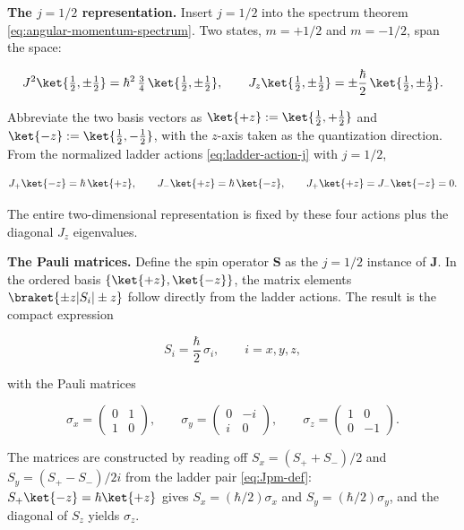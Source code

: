 \medskip\noindent\textbf{The $j=1/2$ representation.} Insert $j = 1/2$ into the spectrum theorem \eqref{eq:angular-momentum-spectrum}. Two states, $m = +1/2$ and $m = -1/2$, span the space:
\begin{linenomath}
  \begin{equation}
    J^2\ket{\tfrac12,\pm\tfrac12} = \hbar^2\,\tfrac34\,\ket{\tfrac12,\pm\tfrac12},
    \qquad
    J_z\ket{\tfrac12,\pm\tfrac12} = \pm\frac{\hbar}{2}\,\ket{\tfrac12,\pm\tfrac12}.
  \end{equation}
\end{linenomath}
Abbreviate the two basis vectors as $\ket{+z} := \ket{\tfrac12,+\tfrac12}$ and $\ket{-z} := \ket{\tfrac12,-\tfrac12}$, with the $z$-axis taken as the quantization direction. From the normalized ladder actions \eqref{eq:ladder-action-j} with $j = 1/2$,
\begin{linenomath}
  \begin{equation}
    J_+\ket{-z} = \hbar\,\ket{+z}, \qquad
    J_-\ket{+z} = \hbar\,\ket{-z}, \qquad
    J_+\ket{+z} = J_-\ket{-z} = 0.
  \end{equation}
\end{linenomath}
The entire two-dimensional representation is fixed by these four actions plus the diagonal $J_z$ eigenvalues.

\medskip\noindent\textbf{The Pauli matrices.} Define the spin operator $\bm S$ as the $j = 1/2$ instance of $\bm J$. In the ordered basis $\{\ket{+z},\ket{-z}\}$, the matrix elements $\braket{\pm z|S_i|\pm z}$ follow directly from the ladder actions. The result is the compact expression
\begin{linenomath}
  \begin{equation}
    S_i = \frac{\hbar}{2}\,\sigma_i, \qquad i = x,y,z,
    \label{eq:pauli-matrices}
  \end{equation}
\end{linenomath}
with the Pauli matrices
\begin{linenomath}
  \begin{equation}
    \sigma_x = \begin{pmatrix} 0 & 1 \\ 1 & 0 \end{pmatrix}, \qquad
    \sigma_y = \begin{pmatrix} 0 & -i \\ i & 0 \end{pmatrix}, \qquad
    \sigma_z = \begin{pmatrix} 1 & 0 \\ 0 & -1 \end{pmatrix}.
  \end{equation}
\end{linenomath}
The matrices are constructed by reading off $S_x = (S_+ + S_-)/2$ and $S_y = (S_+ - S_-)/2i$ from the ladder pair \eqref{eq:Jpm-def}: $S_+\ket{-z} = \hbar\ket{+z}$ gives $S_x = (\hbar/2)\sigma_x$ and $S_y = (\hbar/2)\sigma_y$, and the diagonal of $S_z$ yields $\sigma_z$.

